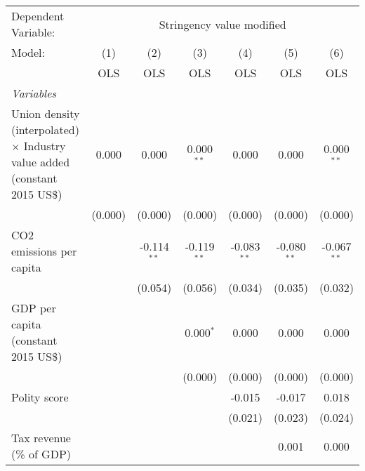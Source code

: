 
\begingroup
\centering
\begin{tabular}{lcccccc}
   \toprule
   Dependent Variable: & \multicolumn{6}{c}{Stringency value modified}\\
   Model:                                                                            & (1)     & (2)           & (3)           & (4)           & (5)           & (6)\\  
                                                                                     &  OLS    & OLS           & OLS           & OLS           & OLS           & OLS\\  
   \midrule
   \emph{Variables}\\
   Union density (interpolated) $\times$ Industry value added (constant 2015 US\$)   & 0.000   & 0.000         & 0.000$^{**}$  & 0.000         & 0.000         & 0.000$^{**}$\\   
                                                                                     & (0.000) & (0.000)       & (0.000)       & (0.000)       & (0.000)       & (0.000)\\   
   CO2 emissions per capita                                                          &         & -0.114$^{**}$ & -0.119$^{**}$ & -0.083$^{**}$ & -0.080$^{**}$ & -0.067$^{**}$\\   
                                                                                     &         & (0.054)       & (0.056)       & (0.034)       & (0.035)       & (0.032)\\   
   GDP per capita (constant 2015 US\$)                                               &         &               & 0.000$^{*}$   & 0.000         & 0.000         & 0.000\\   
                                                                                     &         &               & (0.000)       & (0.000)       & (0.000)       & (0.000)\\   
   Polity score                                                                      &         &               &               & -0.015        & -0.017        & 0.018\\   
                                                                                     &         &               &               & (0.021)       & (0.023)       & (0.024)\\   
   Tax revenue (\% of GDP)                                                           &         &               &               &               & 0.001         & 0.000\\   

\end{tabular}
